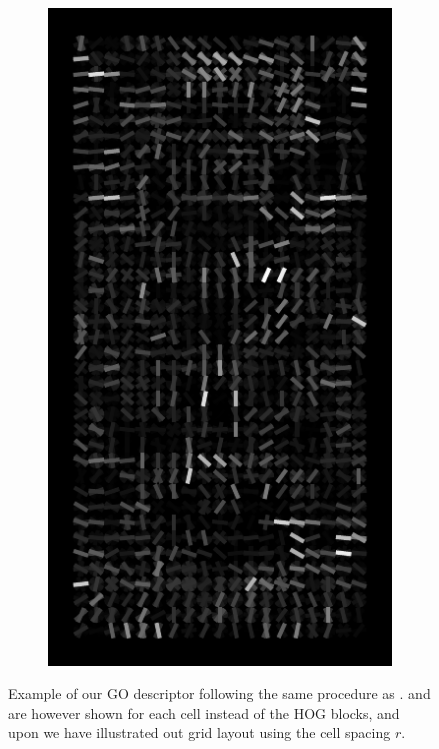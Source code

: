 \documentclass[thesis.tex]{subfiles}
\begin{document}
\begin{figure}[tb]
{\begin{subfigure}[t]{0.17\textwidth}
		\includegraphics[width=\textwidth]{img/inriaExampleDescriptorSvmNeg.pdf}
		\caption{}
		\label{fig:inriaExampleDescriptorSvmNeg}
		\vspace{2mm}
	\end{subfigure}}
	\caption{Example of our GO descriptor following the same procedure as .  and  are however shown for each cell instead of the HOG blocks, and upon  we have illustrated out grid layout using the cell spacing $r$.}
	\label{fig:inriaExample}
\end{figure}
\end{document}
